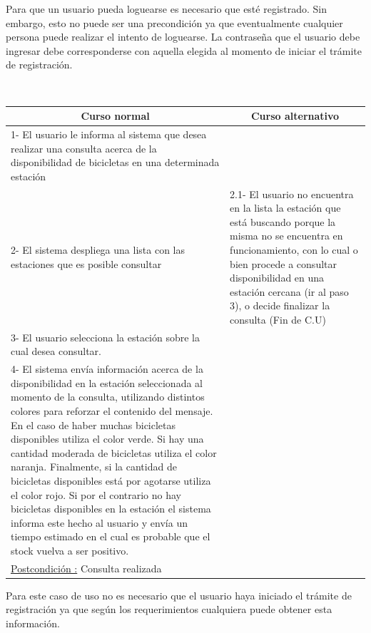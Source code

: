 Para que un usuario pueda loguearse es necesario que esté registrado. Sin embargo, esto no puede ser una precondición ya que
eventualmente cualquier persona puede realizar el intento de loguearse. La contrase\~na que el usuario debe ingresar debe
corresponderse con aquella elegida al momento de iniciar el trámite de registración.

~

\begin{center}
    \centering
    \begin{tabular}{ | p{11cm} | p{6cm} | }
    	\multicolumn{1}{c}{\cellcolor{black!30}\textbf{Curso normal}} & 
    	\multicolumn{1}{c}{\cellcolor{black!30}\textbf{Curso alternativo}} \\
		\hline
		1- El usuario le informa al sistema que desea realizar una consulta acerca de la disponibilidad
		de bicicletas en una determinada estación & \\ \hline
		2- El sistema despliega una lista con las estaciones que es posible consultar & 
		2.1- El usuario no encuentra en la lista la estación que está buscando porque la misma no se encuentra en
		funcionamiento, con lo cual o bien procede a consultar disponibilidad en una estación cercana (ir al paso 3), o
		decide finalizar la consulta (Fin de C.U)\\ \hline
		3- El usuario selecciona la estación sobre la cual desea consultar. & \\ \hline
		4- El sistema envía información acerca de la disponibilidad en la estación seleccionada al momento de la consulta, utilizando distintos colores para reforzar el contenido del mensaje. En el caso de haber muchas bicicletas disponibles utiliza el color verde. Si hay una cantidad moderada de bicicletas utiliza el color naranja. Finalmente,
		si la cantidad de bicicletas disponibles está por agotarse utiliza el color rojo. Si por el contrario no hay
		bicicletas disponibles en la estación el sistema informa este hecho al usuario y envía un tiempo estimado en el cual
		es probable que el stock vuelva a ser positivo. & \\ \hline
		\underline{Postcondición :} Consulta realizada & \\ \hline
    \end{tabular}
\end{center}	

Para este caso de uso no es necesario que el usuario haya iniciado el trámite de registración ya que según los
requerimientos cualquiera puede obtener esta información.

